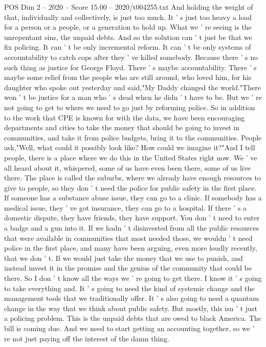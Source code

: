 \begin{textsample}{POS Dim 2 – 2020 – Score 15.00 – 2020/t004255.txt}
And holding the weight of that, individually and collectively, is just too much.
It ' s just too heavy a load for a person or a people, or a generation to hold up.
What we ' re seeing is the unrepentant sins, the unpaid debts.
And so the solution can ' t just be that we fix policing.
It can ' t be only incremental reform.
It can ' t be only systems of accountability to catch cops after they ' ve killed somebody.
Because there ' s no such thing as justice for George Floyd.
There ' s maybe accountability.
There ' s maybe some relief from the people who are still around, who loved him, for his daughter who spoke out yesterday and said,"My Daddy changed the world."There won ' t be justice for a man who ' s dead when he didn ' t have to be.
But we ' re not going to get to where we need to go just by reforming police.
So in addition to the work that CPE is known for with the data, we have been encouraging departments and cities to take the money that should be going to invest in communities, and take it from police budgets, bring it to the communities.
People ask,"Well, what could it possibly look like?
How could we imagine it?"And I tell people, there is a place where we do this in the United States right now.
We ' ve all heard about it, whispered, some of us have even been there, some of us live there.
The place is called the suburbs, where we already have enough resources to give to people, so they don ' t need the police for public safety in the first place.
If someone has a substance abuse issue, they can go to a clinic.
If somebody has a medical issue, they ' ve got insurance, they can go to a hospital.
If there ' s a domestic dispute, they have friends, they have support.
You don ' t need to enter a badge and a gun into it.
If we hadn ' t disinvested from all the public resources that were available in communities that most needed those, we wouldn ' t need police in the first place, and many have been arguing, even more loudly recently, that we don ' t.
If we would just take the money that we use to punish, and instead invest it in the promise and the genius of the community that could be there.
So I don ' t know all the ways we ' re going to get there.
I know it ' s going to take everything and.
It ' s going to need the kind of systemic change and the management tools that we traditionally offer.
It ' s also going to need a quantum change in the way that we think about public safety.
But mostly, this isn ' t just a policing problem.
This is the unpaid debts that are owed to black America.
The bill is coming due.
And we need to start getting an accounting together, so we ' re not just paying off the interest of the damn thing.

\end{textsample}
